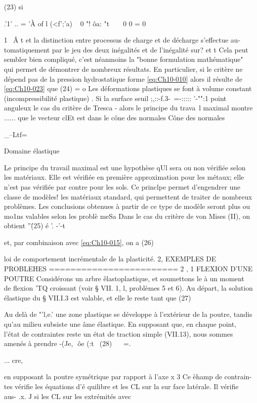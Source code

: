 {{{{(23) 
si

.'1' .. = 'À of l (<f';'a) ~ 0 
"! 
ôa:
"t 
~ ~ 0 0 = 0

1~ Â t 
et la distinction entre processus de charge et de décharge s'effectue au­tomatiquement par le jeu des deux inégalités et de l'inégalité sur? et t Cela peut sembler bien compliqué, c'est néanmoins la "bonne formulation ma­thématique" qui permet de démontrer de nombreux résultats. 
En particulier, si le critère ne dépend pas de la pression hydro­statique forme \eqref{eq:Ch10-010} alors il résulte de \eqref{eq:Ch10-023} que 
(24) = o 
Les déformations plastiques se font à volume constant (incompressibilité plastique) . 
Si  la  surface seuil  ;,::-f.3-~=-:::::  '-"":1  point anguleux  
le cas  du critère de  Tresca  - alors  le  principe du  trava~l maximal  montre  
......  
que  le  vecteur  clEt  est  dans  le  cône  des normales  
Cône  des  normales  

_--Ltf=~ 

Domaine élastique 

Le principe du travail maximal est une hypothèse qUl sera ou non vérifiée selon les matériaux. Elle est vérifiée en première approximation pour les métaux; elle n'est pas vérifiée par contre pour les sols. Ce prin­clpe permet d'engendrer une classe de modèles! les matériaux standard, qui permettent de traiter de nombreux problèmes. Les conclusions obtenues à 
partir de ce type de modèle seront plus ou mo1ns valables selon les problè­
meSa 
Dans le cas du critère de von Mises (II), on obtient 
''\'
(25) 	é '. 
-'-t 


et, par combinaison avec \eqref{eq:Ch10-015}, on a 
(26) 

loi de comportement incrémentale de la plasticité. 
2, EXEMPLES DE PROBLEHES 
======================== 
2 , 1 FLEXION D'UNE POUTRE 
Considérons un arbre êlastoplastique, et soumettons le à un moment 
de flexion 'TQ croissant (voir § VII. 1, l, problèmes 5 et 6). Au départ, la 
solution élastique du § VII.I.3 est valable, et elle le reste tant que 
(27) 

Au delà de "'l,e.' une zone plastique se développe à l'extérieur de la poutre, tandis qu'au milieu subsiste une âme élastique. En supposant que, en chaque 
point, l'état de contraintes reste un état de traction simple (VII.13), nous 
sommes amenés à prendre 
-(Je, 
 ôe (:t~
(28) 
~~ =. 
} 
... cre, 

en supposant la poutre symétrique par rapport à l'axe x
3 Ce èhamp de contrain­
tes vérifie les équations d'é­
quilibre et les CL 	sur la sur­
face latérale. Il vérifie aus-	.x. 
J 
si les CL sur les extrémités 
avec 


}}}

